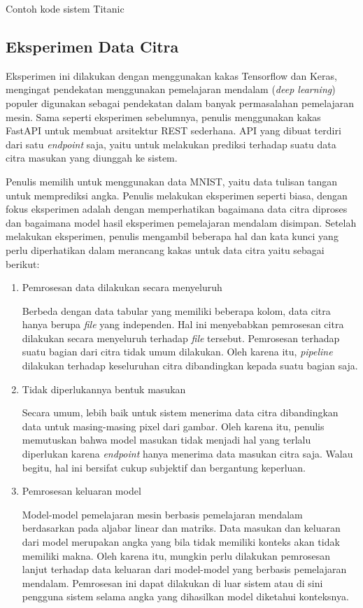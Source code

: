 \begin{code}
	\caption{Contoh kode sistem Titanic}
	\label{listing:15}
\end{code}

\subsection{Eksperimen Data Citra}
Eksperimen ini dilakukan dengan menggunakan kakas Tensorflow dan Keras, mengingat pendekatan menggunakan pemelajaran mendalam (\textit{deep learning}) populer digunakan sebagai pendekatan dalam banyak permasalahan pemelajaran mesin.
Sama seperti eksperimen sebelumnya, penulis menggunakan kakas FastAPI untuk membuat arsitektur REST sederhana.
API yang dibuat terdiri dari satu \textit{endpoint} saja, yaitu untuk melakukan prediksi terhadap suatu data citra masukan yang diunggah ke sistem.

Penulis memilih untuk menggunakan data MNIST, yaitu data tulisan tangan untuk memprediksi angka.
Penulis melakukan eksperimen seperti biasa, dengan fokus eksperimen adalah dengan memperhatikan bagaimana data citra diproses dan bagaimana model hasil eksperimen pemelajaran mendalam disimpan.
Setelah melakukan eksperimen, penulis mengambil beberapa hal dan kata kunci yang perlu diperhatikan dalam merancang kakas untuk data citra yaitu sebagai berikut:

\begin{enumerate}
	\item Pemrosesan data dilakukan secara menyeluruh
	
	Berbeda dengan data tabular yang memiliki beberapa kolom, data citra hanya berupa \textit{file} yang independen.
	Hal ini menyebabkan pemrosesan citra dilakukan secara menyeluruh terhadap \textit{file} tersebut.
	Pemrosesan terhadap suatu bagian dari citra tidak umum dilakukan.
	Oleh karena itu, \textit{pipeline} dilakukan terhadap keseluruhan citra dibandingkan kepada suatu bagian saja. 

	\item Tidak diperlukannya bentuk masukan
	
	Secara umum, lebih baik untuk sistem menerima data citra dibandingkan data untuk masing-masing pixel dari gambar.
	Oleh karena itu, penulis memutuskan bahwa model masukan tidak menjadi hal yang terlalu diperlukan karena \textit{endpoint} hanya menerima data masukan citra saja.
	Walau begitu, hal ini bersifat cukup subjektif dan bergantung keperluan.
	
	\item Pemrosesan keluaran model
	
	Model-model pemelajaran mesin berbasis pemelajaran mendalam berdasarkan pada aljabar linear dan matriks.
	Data masukan dan keluaran dari model merupakan angka yang bila tidak memiliki konteks akan tidak memiliki makna.
	Oleh karena itu, mungkin perlu dilakukan pemrosesan lanjut terhadap data keluaran dari model-model yang berbasis pemelajaran mendalam.
	Pemrosesan ini dapat dilakukan di luar sistem atau di sini pengguna sistem selama angka yang dihasilkan model diketahui konteksnya.

\end{enumerate}

